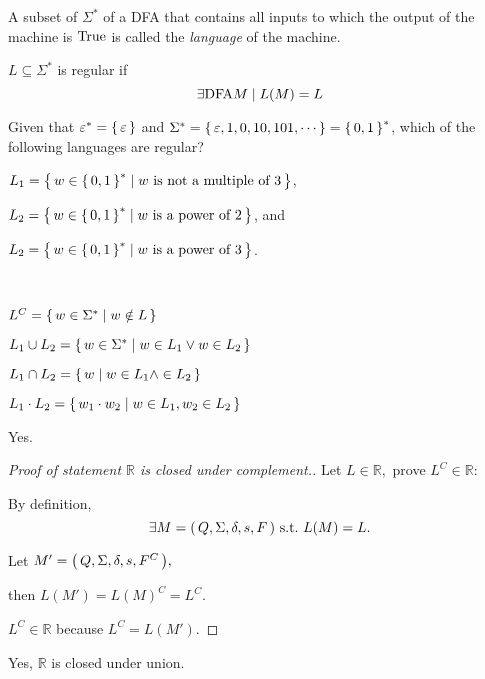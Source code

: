 
A subset of $\Sigma^*$ of a DFA that contains all inputs to which the output of the
machine is ${ \text{\upshape True} }$ is called the \emph{language} of the machine.

\begin{definition}
    $ L \subseteq \Sigma^* $
    is regular if
    \[
        \exists {\text{\upshape DFA} M} \mid L(M) = L
    \]
\end{definition}

\begin{example}[]
    Given that
    $\varepsilon^* = { \left\{\,\varepsilon\,\right\} }$
    and
    $\Sigma^* = { \left\{\,\varepsilon,1,0,10,101,\cdots\,\right\} } = { \left\{\,0,1\,\right\} }^*$,
    which of the following languages are regular?
    \begin{compactitem}
    \item
        $L_1 = { \left\{\, w \in { \left\{\,0,1\,\right\} }^* \mid w \text{ is not a multiple of } 3\,\right\} }$,
    \item
        $L_2 = { \left\{\, w \in { \left\{\,0,1\,\right\} }^* \mid w \text{ is a power of } 2\,\right\} }$, and
    \item
        $L_2 = { \left\{\, w \in { \left\{\,0,1\,\right\} }^* \mid w \text{ is a power of } 3\,\right\} }$.
    \end{compactitem}
    

\end{example}

\begin{definition} \ \\
    \begin{compactdesc}
    \item[Complement]
        $L^C = { \left\{\,w \in \Sigma^* \mid w \notin L\,\right\} }$
    \item[Union]
        $L_1 \cup L_2 = { \left\{\,w \in \Sigma^* \mid w \in L_1 \vee w \in L_2\,\right\} }$
    \item[Intersection]
        $L_1 \cap L_2 = { \left\{\,w \mid w \in L_1 \wedge \in L_2\,\right\} }$
    \item[Dot Product]
        $L_1 \cdot L_2 = { \left\{\,w_1 \cdot w_2 \mid w \in L_1, w_2 \in L_2\,\right\} }$
    \end{compactdesc}
\end{definition}

\begin{example}
    Yes.

    \begin{proof}[Proof of statement $\mathbb R$ is closed under complement.]
        Let $L \in \mathbb R,$
        prove $L^C \in \mathbb R:$

        By definition, 
        \[
            \exists \DFA \text{ s.t.\ } L(M) = L.
        \]

        Let $M' = { \left(\,Q,\Sigma,\delta,s,F^C\,\right) },$

        then $L(M') = L(M)^C = L^C.$

        $L^C \in \mathbb R$ because $L^C = L(M').$
    \end{proof}
\end{example}

\begin{example}
        Yes, $\mathbb R$ is closed under union.
\end{example}

